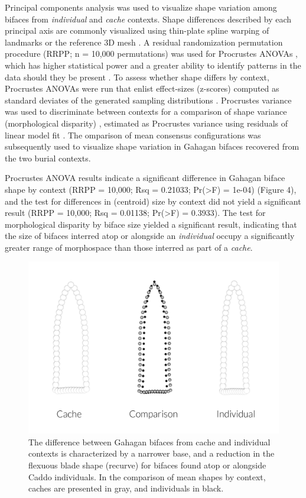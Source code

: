 \documentclass[]{interact}
\theoremstyle{plain}%
\theoremstyle{definition}
\theoremstyle{remark}
\begin{document}
Principal components analysis \citep{RN8576,RN10875} was used to
visualize shape variation among bifaces from \emph{individual} and
\emph{cache} contexts. Shape differences described by each principal
axis are commonly visualized using thin-plate spline warping of
landmarks or the reference 3D mesh \citep{RN8555,RN8553}. A residual
randomization permutation procedure (RRPP; n = 10,000 permutations) was
used for Procrustes ANOVAs \citep{RN8579,RN8334}, which has higher
statistical power and a greater ability to identify patterns in the data
should they be present \citep{RN6995}. To assess whether shape differs
by context, Procrustes ANOVAs \citep{RN7046} were run that enlist
effect-sizes (z-scores) computed as standard deviates of the generated
sampling distributions \citep{RN8477}. Procrustes variance was used to
discriminate between contexts for a comparison of shape variance
(morphological disparity) \citep{RN5694}, estimated as Procrustes
variance using residuals of linear model fit \citep{RN8565,RN9565}. The
omparison of mean consensus configurations was subsequently used to
visualize shape variation in Gahagan bifaces recovered from the two
burial contexts.

Procrustes ANOVA results indicate a significant difference in Gahagan
biface shape by context (RRPP = 10,000; Rsq = 0.21033;
Pr(\textgreater F) = 1e-04) (Figure 4), and the test for differences in
(centroid) size by context did not yield a significant result (RRPP =
10,000; Rsq = 0.01138; Pr(\textgreater F) = 0.3933). The test for
morphological disparity by biface size yielded a significant result,
indicating that the size of bifaces interred atop or alongside an
\emph{individual} occupy a significantly greater range of morphospace
than those interred as part of a \emph{cache}.

\begin{figure}

{\centering \includegraphics[width=0.9\linewidth]{img/fig05} 

}

\caption{The difference between Gahagan bifaces from cache and individual contexts is characterized by a narrower base, and a reduction in the flexuous blade shape (recurve) for bifaces found atop or alongside Caddo individuals. In the comparison of mean shapes by context, caches are presented in gray, and individuals in black.}\label{fig:mshape.bpractice}
\end{figure}
\end{document}
